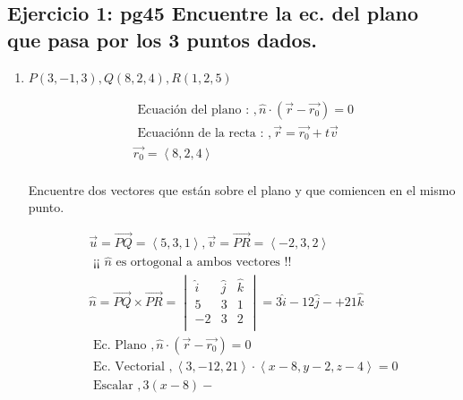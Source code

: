 \subsection{Ejercicio 1: pg45 Encuentre la ec. del plano que pasa por los 3 puntos dados.}
\begin{enumerate}
    \item $P(3,-1,3), Q(8,2,4), R(1,2,5)$
        \begin{center}
            \begin{align*}
                \text{  Ecuación del plano :   }, \hat{n} \cdot (\vec{r}- \vec{r_0}) = 0\\
                \text{  Ecuaciónn de la recta :   }, \vec{r} = \vec{r_0}+t \vec{v} \\ 
                \vec{r_0} = \left\langle 8,2,4 \right\rangle  \\ 
            \end{align*}
        \end{center}
    Encuentre dos vectores que están sobre el plano y que comiencen en el mismo punto.
        \begin{center}
            \begin{align*}
                \vec{u}= \overrightarrow{PQ} = \left\langle 5,3,1  \right\rangle, \vec{v}= \overrightarrow{PR}= \left\langle -2,3,2 \right\rangle \\ 
                \text{  ¡¡ $\hat{n}$ es ortogonal a ambos vectores !! } \\ 
                \hat{n} = \overrightarrow{PQ} \times \overrightarrow{PR} = \begin{vmatrix}
                    \hat{i}& \hat{j}& \hat{k} \\
                    5 & 3 & 1 \\ 
                    -2 & 3 & 2 \\   
                \end{vmatrix} = 3 \hat{i} - 12 \hat{j} -+ 21 \hat{k} \\ 
                \text{  Ec. Plano  }, \hat{n} \cdot ( \vec{r} - \vec{r_0}) = 0 \\ 
                \text{  Ec. Vectorial  }, \left\langle 3,-12,21 \right\rangle \cdot \left\langle x-8,y-2,z-4 \right\rangle = 0 \\ 
                \text{  Escalar  }, 3(x-8)-  
            \end{align*}
        \end{center}


\end{enumerate}
